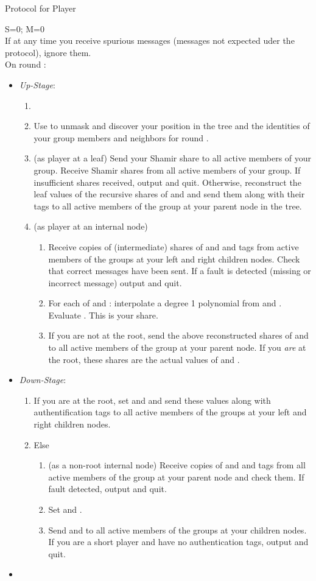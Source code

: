 \documentclass[12pt]{article}
\theoremstyle{definition}
\newcommand{\upStage}{\emph{Up-Stage}\xspace}
\newcommand{\downStage}{\emph{Down-Stage}\xspace}
\begin{document}
\begin{algorithm}
{\small 
\caption{Protocol for Player } \label{alg:mofnPlayer} 
S=0; M=0 \\
If at any time you receive spurious messages (messages not expected uder the 
protocol), ignore them. \\
On round :
\begin{itemize}
\item[] \upStage:
\begin{enumerate}
\item 
\item Use  to unmask and discover your position in the 
tree and the identities of your group members and neighbors for round .
\item (as player at a leaf)
Send your Shamir share to all active members of your group. Receive Shamir 
shares from all active members of your group. If insufficient shares received, 
output  and quit. Otherwise, reconstruct the leaf values of the recursive  
shares of  and   and send them along with their tags to all 
active members of the group at your 
parent node in the tree.
\item (as player at an internal node) 
\begin{enumerate}
\item Receive copies of (intermediate) shares of  and  
and tags from active members of the groups at your left and right children 
nodes. Check that correct messages have been sent.
If a fault is detected (missing or incorrect message) output  and quit.
\item For each of  and : interpolate a degree 1 polynomial  
from  and . 
Evaluate . This is your share.
\item If you are not at the root, send the above reconstructed shares of  
and  to all active members of the group at your parent node. If you 
\emph{are} at the root, these shares are the actual values of  and 
.
\end{enumerate}
\end{enumerate}
\item[] \downStage:
\begin{enumerate}
\item If you are at the root, set  and  and send these 
values along with authentification tags to all active members of the groups at
your left and right children nodes.
\item Else
\begin{enumerate}
\item (as a non-root internal node) Receive copies of  and  
and tags from all active members of the group at 
your parent node and check them. If fault detected, 
output  and quit.
\item Set  and .
\item Send  and  to all active members of the groups at your 
children nodes.
If you are a short player and have no authentication tags, output  and 
quit.
\end{enumerate}
\end{enumerate}
\item[] 
\end{itemize}
}
\end{algorithm}
\end{document}
